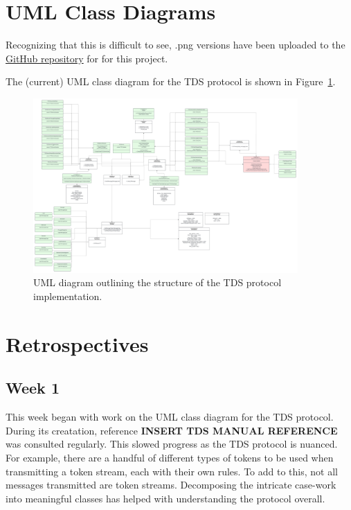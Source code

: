 \documentclass{article}
\begin{document}
\section{UML Class Diagrams}\label{sec:uml}
    Recognizing that this is difficult to see, .png versions have been uploaded to the \href{https://github.com/SawyersCoding/bookdex/tree/main}{GitHub repository} for for this project.

    The (current) UML class diagram for the TDS protocol is shown in Figure~\ref{fig:tdsuml}.

    \begin{figure}[h]\label{fig:tdsuml}
        \includegraphics[width=0.9\textwidth]{uml_tds.png}
        \caption{UML diagram outlining the structure of the TDS protocol implementation.}
    \end{figure}


\section{Retrospectives}\label{sec:retro}
    \subsection{Week 1}\label{sec:retro:week1}
        This week began with work on the UML class diagram for the TDS protocol. During its creatation, reference \textbf{INSERT TDS MANUAL REFERENCE} was consulted regularly. This slowed progress as the TDS protocol is nuanced. For example, there are a handful of different types of tokens to be used when transmitting a token stream, each with their own rules. To add to this, not all messages transmitted are token streams. Decomposing the intricate case-work into meaningful classes has helped with understanding the protocol overall.
\end{document}
